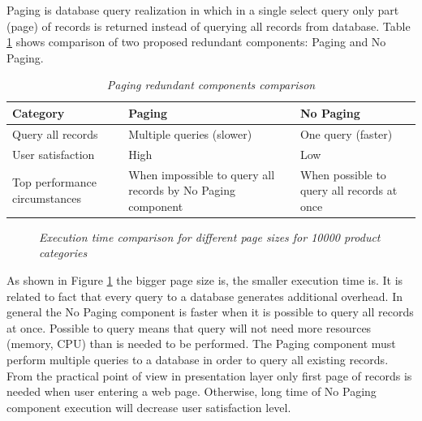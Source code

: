 \documentclass[12pt,a4paper]{article}
\begin{document}
Paging is database query realization in which in a single select query only part (page) of records is returned instead of querying all records from database. Table \ref{pagingcomponents} shows comparison of two proposed redundant components: Paging and No Paging.  
\begin{table}[!htb]
\begin{center}
\begin{tabularx}{\textwidth}{p{3.5cm}|X|X}
  \textbf{Category} &\textbf{Paging} & \textbf{No Paging} \\
\hline
Query all records & Multiple queries (slower) & One query (faster) \\
User satisfaction & High & Low\\
Top performance circumstances & When impossible to query all records by No Paging component & When possible to query all records at once\\
\end{tabularx}
\end{center}
\caption{\textit{Paging redundant components comparison}}\label{pagingcomponents}
\end{table}

\begin{figure}[!htb]
\centering
{}

\caption{\textit{Execution time comparison for different page sizes for 10000 product categories}} \label{fig:pagesizetime}

\end{figure}

As shown in Figure \ref{fig:pagesizetime} the bigger page size is, the smaller execution time is. It is related to fact that every query to a database generates additional overhead. 
In general the No Paging component is faster when it is possible to query all records at once. Possible to query means that query will not need more resources (memory, CPU) than is needed to be performed. 
The Paging component must perform multiple queries to a database in order to query all existing records. From the practical point of view in presentation layer only first page of records is needed when user entering a web page. Otherwise, long time of No Paging component execution will decrease user satisfaction level.  
\end{document}
